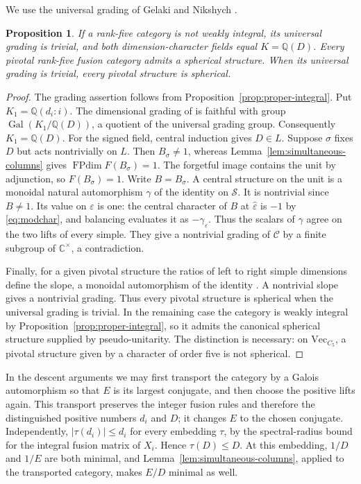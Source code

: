 \documentclass[11pt,a4paper]{article}
\newtheorem{proposition}[theorem]{Proposition}
\numberwithin{equation}{section}
\begin{document}
We use the universal grading of Gelaki and Nikshych
\cite[Theorem~3.5 and Corollary~3.7]{GN}.
\begin{proposition}\label{prop:field}
If a rank-five category is not weakly integral, its universal grading is
trivial, and both dimension-character fields equal $K=\mathbb Q(D)$.
Every pivotal rank-five fusion category admits a spherical structure.
When its universal grading is trivial, every pivotal structure is spherical.
\end{proposition}
\begin{proof}
The grading assertion follows from Proposition~\ref{prop:proper-integral}.
Put $K_1=\mathbb Q(d_i:i)$. The dimensional grading of
\cite[Proposition~1.8]{GannonSchopieray} is faithful with group
$\operatorname{Gal}(K_1/\mathbb Q(D))$, a quotient of the universal
grading group. Consequently $K_1=\mathbb Q(D)$.
For the signed field, central induction gives $D\in L$. Suppose
$\sigma$ fixes $D$ but acts nontrivially on $L$. Then
$B_\sigma\ne1$, whereas Lemma~\ref{lem:simultaneous-columns} gives
$\operatorname{FPdim}F(B_\sigma)=1$. The forgetful image contains the
unit by adjunction, so $F(B_\sigma)=1$. Write $B=B_\sigma$. A central structure on the unit is
a monoidal natural automorphism $\gamma$ of the identity on $\mathcal S$.
It is nontrivial since $B\ne1$. Its value on $\varepsilon$ is one:
the central character of $B$ at $\widehat\varepsilon$ is $-1$ by
\eqref{eq:modchar}, and balancing evaluates it as
$-\gamma_\varepsilon$.
Thus the scalars of $\gamma$ agree on the two lifts of every simple.
They give a nontrivial grading of $\mathcal C$ by a finite subgroup of
$\mathbb C^\times$, a contradiction.

Finally, for a given pivotal structure the ratios of left to right
simple dimensions define the slope, a monoidal automorphism of the
identity \cite[Section~4]{BV}. A nontrivial slope gives a nontrivial
grading. Thus every pivotal structure is spherical when the universal
grading is trivial. In the remaining case the category is weakly
integral by Proposition~\ref{prop:proper-integral}, so it admits the
canonical spherical structure supplied by pseudo-unitarity.
The distinction is necessary: on $\mathrm{Vec}_{C_5}$, a pivotal
structure given by a character of order five is not spherical.
\end{proof}



In the descent arguments we may first transport the category by a
Galois automorphism so that $E$ is its largest conjugate, and then
choose the positive lifts again. This transport preserves the integer
fusion rules and therefore the distinguished positive numbers $d_i$
and $D$; it changes $E$ to the chosen conjugate. Independently,
$|\tau(d_i)|\le d_i$ for every embedding $\tau$, by the spectral-radius
bound for the integral fusion matrix of $X_i$. Hence $\tau(D)\le D$.
At this embedding, $1/D$ and $1/E$ are both minimal, and
Lemma~\ref{lem:simultaneous-columns}, applied to the transported
category, makes $E/D$ minimal as well.
\end{document}
